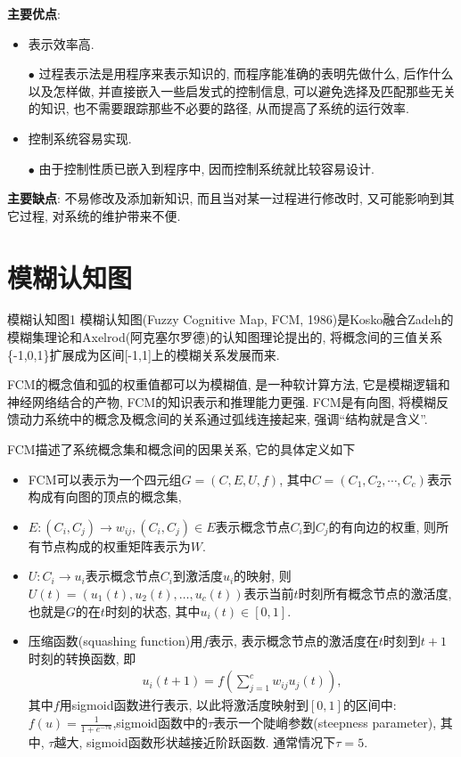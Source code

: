 \textbf{主要优点}:
\begin{itemize}
\item  表示效率高.

    $\bullet$ 过程表示法是用程序来表示知识的, 而程序能准确的表明先做什么, 后作什么以及怎样做, 并直接嵌入一些启发式的控制信息, 可以避免选择及匹配那些无关的知识, 也不需要跟踪那些不必要的路径, 从而提高了系统的运行效率.
\item  控制系统容易实现.

    $\bullet$ 由于控制性质已嵌入到程序中, 因而控制系统就比较容易设计.
\end{itemize}

\textbf{主要缺点}: 不易修改及添加新知识, 而且当对某一过程进行修改时, 又可能影响到其它过程, 对系统的维护带来不便.
\section{模糊认知图}
\begin{mydef}{模糊认知图}{1}
模糊认知图(Fuzzy Cognitive Map, FCM, 1986)是Kosko融合Zadeh的模糊集理论和Axelrod(阿克塞尔罗德)的认知图理论提出的, 将概念间的三值关系\{-1,0,1\}扩展成为区间[-1,1]上的模糊关系发展而来.
\end{mydef}

FCM的\textcolor[rgb]{0,0,1}{概念值}和弧的权重值都可以为模糊值, 是一种软计算方法, 它是模糊逻辑和神经网络结合的产物, FCM的知识表示和推理能力更强.
FCM是有向图, 将模糊反馈动力系统中的概念及概念间的关系通过弧线连接起来, 强调“结构就是含义”.

FCM描述了系统概念集和概念间的因果关系, 它的具体定义如下
\begin{itemize}
\item FCM可以表示为一个四元组$G=(C,E,U,f)$, 其中$C=(C_1,C_2,\cdots, C_c)$表示构成有向图的顶点的概念集,
\item $E:\left(C_{i}, C_{j}\right) \rightarrow w_{i j}, (C_{i}, C_{j})\in E$​表示概念节点$C_i$​到$C_j$​的有向边的权重, 则所有节点构成的权重矩阵表示为$W$.
\item $U: C_{i} \rightarrow u_{i}$​表示概念节点$C_i$​到激活度$u_i$​的映射, 则$U(t)=\left(u_{1}(t), u_{2}(t), \dots, u_{c}(t)\right)$表示当前$t$时刻所有概念节点的激活度, 也就是$G$的在$t$时刻的状态, 其中$u_{i}(t) \in[0,1]$.
\item 压缩函数(squashing function)用$f$表示, 表示概念节点的激活度在$t$时刻到$t+1$时刻的转换函数, 即
\begin{align}
    u_{i}(t+1)=f\left(\sum_{j=1}^{c} w_{i j} u_{j}(t)\right),
\end{align}
其中$f$用sigmoid函数进行表示, 以此将激活度映射到$[0,1]$的区间中: $f(u)=\frac{1}{1+e^{-\tau u}}$, ​sigmoid函数中的$\tau$表示一个陡峭参数(steepness parameter), 其中, $\tau$越大, sigmoid函数形状越接近阶跃函数. 通常情况下$\tau=5$.
\end{itemize}

